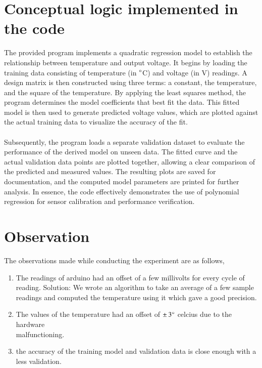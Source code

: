 \documentclass[journal,12pt,onecolumn]{IEEEtran}
\begin{document}
\section{\textbf{Conceptual logic implemented in the code}}
The provided program implements a quadratic regression model to establish the relationship between temperature and output voltage. It begins by loading the training data consisting of temperature (in $\degree$C) and voltage (in V) readings. A design matrix is then constructed using three terms: a constant, the temperature, and the square of the temperature. By applying the least squares method, the program determines the model coefficients that best fit the data. This fitted model is then used to generate predicted voltage values, which are plotted against the actual training data to visualize the accuracy of the fit.\\
\\
Subsequently, the program loads a separate validation dataset to evaluate the performance of the derived model on unseen data. The fitted curve and the actual validation data points are plotted together, allowing a clear comparison of the predicted and measured values. The resulting plots are saved for documentation, and the computed model parameters are printed for further analysis. In essence, the code effectively demonstrates the use of polynomial regression for sensor calibration and performance verification.

\section{\textbf{Observation}}
The observations made while conducting the experiment are as follows,
\begin{enumerate}
    \item The readings of arduino had an offset of a few millivolts for every cycle of reading.
    Solution: We wrote an algorithm to take an average of a few sample readings and computed the temperature using it which gave a good precision.
    \item The values of the temperature had an offset of $\pm \,3\degree$ celcius due to the hardware \\malfunctioning.
    \item the accuracy of the training model and validation data is close enough with a less validation.
\end{enumerate}
\end{document}
